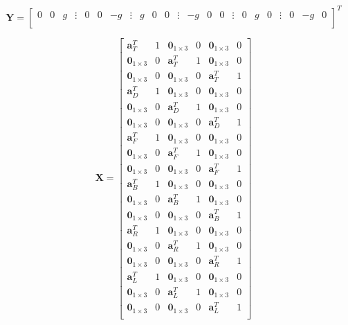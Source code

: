 \begin{equation}
	\bm{Y} = \begin{bmatrix} 0 & 0 & g & \vdots & 0 & 0 & -g & \vdots & g & 0 & 0 & \vdots & -g & 0 & 0  & \vdots& 0 & g & 0 & \vdots & 0 & -g & 0 \\
	\end{bmatrix}^T
	\label{ols_y}
\end{equation}

\begin{equation}
	\bm{X} = 
	\begin{bmatrix}
	\bm{a}^T_T & 1 & \bm{0}_{1 \times 3} & 0 & \bm{0}_{1 \times 3} & 0\\
	\bm{0}_{1 \times 3} & 0 & \bm{a}^T_T & 1 & \bm{0}_{1 \times 3} & 0\\
	\bm{0}_{1 \times 3} & 0 & \bm{0}_{1 \times 3} & 0 & \bm{a}^T_T & 1\\
	
	\bm{a}^T_D & 1 & \bm{0}_{1 \times 3} & 0 & \bm{0}_{1 \times 3} & 0\\
	\bm{0}_{1 \times 3} & 0 & \bm{a}^T_D & 1 & \bm{0}_{1 \times 3} & 0\\
	\bm{0}_{1 \times 3} & 0 & \bm{0}_{1 \times 3} & 0 & \bm{a}^T_D & 1\\
	
	\bm{a}^T_F & 1 & \bm{0}_{1 \times 3} & 0 & \bm{0}_{1 \times 3} & 0\\
	\bm{0}_{1 \times 3} & 0 & \bm{a}^T_F & 1 & \bm{0}_{1 \times 3} & 0\\
	\bm{0}_{1 \times 3} & 0 & \bm{0}_{1 \times 3} & 0 & \bm{a}^T_F & 1\\
	
	\bm{a}^T_B & 1 & \bm{0}_{1 \times 3} & 0 & \bm{0}_{1 \times 3} & 0\\
	\bm{0}_{1 \times 3} & 0 & \bm{a}^T_B & 1 & \bm{0}_{1 \times 3} & 0\\
	\bm{0}_{1 \times 3} & 0 & \bm{0}_{1 \times 3} & 0 & \bm{a}^T_B & 1\\
	
	\bm{a}^T_R & 1 & \bm{0}_{1 \times 3} & 0 & \bm{0}_{1 \times 3} & 0\\
	\bm{0}_{1 \times 3} & 0 & \bm{a}^T_R & 1 & \bm{0}_{1 \times 3} & 0\\
	\bm{0}_{1 \times 3} & 0 & \bm{0}_{1 \times 3} & 0 & \bm{a}^T_R & 1\\
	
	\bm{a}^T_L & 1 & \bm{0}_{1 \times 3} & 0 & \bm{0}_{1 \times 3} & 0\\
	\bm{0}_{1 \times 3} & 0 & \bm{a}^T_L & 1 & \bm{0}_{1 \times 3} & 0\\
	\bm{0}_{1 \times 3} & 0 & \bm{0}_{1 \times 3} & 0 & \bm{a}^T_L & 1\\
	\end{bmatrix} 
	\label{ols_x}
\end{equation}
